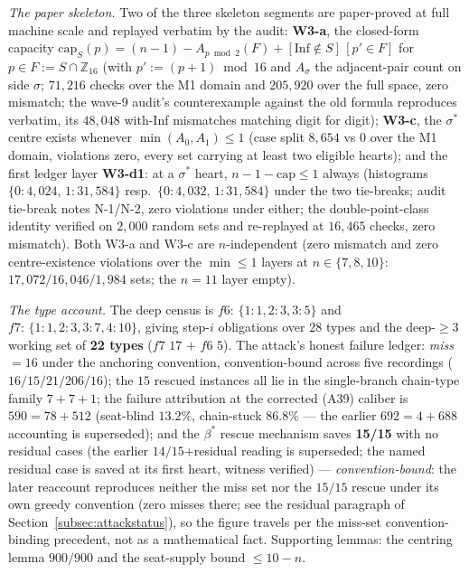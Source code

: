 \emph{The paper skeleton.} Two of the three skeleton segments are paper-proved at full
machine scale and replayed verbatim by the audit: \textbf{W3-a}, the closed-form capacity
$\mathrm{cap}_S(p)=(n-1)-A_{p\bmod2}(F)+[\mathrm{Inf}\notin S]\,[p'\in F]$ for
$p\in F:=S\cap\mathbb{Z}_{16}$ (with $p':=(p+1)\bmod16$ and $A_\sigma$ the adjacent-pair
count on side $\sigma$; $71{,}216$ checks over the M1 domain and $205{,}920$ over the full
space, zero mismatch; the wave-9 audit's counterexample against the old formula reproduces
verbatim, its $48{,}048$ with-Inf mismatches matching digit for digit); \textbf{W3-c}, the
$\sigma^\ast$ centre exists whenever $\min(A_0,A_1)\le1$ (case split $8{,}654$ vs $0$ over
the M1 domain, violations zero, every set carrying at least two eligible hearts); and the
first ledger layer \textbf{W3-d1}: at a $\sigma^\ast$ heart, $n-1-\mathrm{cap}\le1$ always
(histograms $\{0{:}4{,}024,\,1{:}31{,}584\}$ resp.\ $\{0{:}4{,}032,\,1{:}31{,}584\}$ under
the two tie-breaks; audit tie-break notes N-1/N-2, zero violations under either; the
double-point-class identity verified on $2{,}000$ random sets and re-replayed at $16{,}465$
checks, zero mismatch). Both W3-a and W3-c are $n$-independent (zero mismatch and zero
centre-existence violations over the $\min\le1$ layers at $n\in\{7,8,10\}$:
$17{,}072/16{,}046/1{,}984$ sets; the $n=11$ layer empty).

\emph{The type account.} The deep census is $f6{:}\,\{1{:}1,2{:}3,3{:}5\}$ and
$f7{:}\,\{1{:}1,2{:}3,3{:}7,4{:}10\}$, giving step-$i$ obligations over $28$ types and the
deep-$\ge3$ working set of \textbf{22 types} ($f7$ $17$ $+$ $f6$ $5$). The attack's honest
failure ledger: \emph{miss} $=16$ under the anchoring convention, convention-bound across
five recordings ($16/15/21/206/16$); the $15$ rescued instances all lie in the single-branch
chain-type family $7+7+1$; the failure attribution at the corrected (A39) caliber is
$590=78+512$ (seat-blind $13.2\%$, chain-stuck $86.8\%$ --- the earlier $692=4+688$
accounting is superseded); and the $\beta^\ast$ rescue mechanism saves \textbf{15/15}
with no residual cases (the earlier $14/15$+residual reading is superseded; the named
residual case is saved at its first heart, witness verified) --- \emph{convention-bound}:
the later reaccount reproduces neither the miss set nor the $15/15$ rescue under its own
greedy convention (zero misses there; see the residual paragraph of
Section~\ref{subsec:attackstatus}), so the figure travels per the miss-set
convention-binding precedent, not as a mathematical fact. Supporting lemmas: the centring lemma
$900/900$ and the seat-supply bound $\le10-n$.

